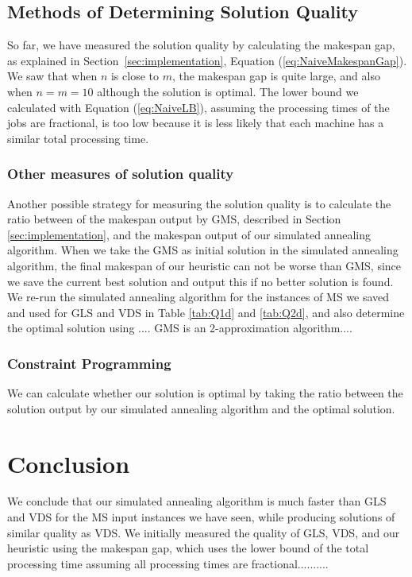 \documentclass[12pt,a4paper,reqno]{article}
\begin{document}
\newpage
\subsection{Methods of Determining Solution Quality} \label{subsec:SolQual}
So far, we have measured the solution quality by calculating the makespan gap, as explained in Section~\ref{sec:implementation}, Equation (\ref{eq:NaiveMakespanGap}). We saw that when $n$ is close to $m$, the makespan gap is quite large, and also when $n=m=10$ although the solution is optimal. The lower bound we calculated with Equation (\ref{eq:NaiveLB}), assuming the processing times of the jobs are fractional, is too low because it is less likely that each machine has a similar total processing time.  \\

\subsubsection{Other measures of solution quality}
\color{red}
Another possible strategy for measuring the solution quality is to calculate the ratio between of the makespan output by GMS, described in Section \ref{sec:implementation}, and the makespan output of our simulated annealing algorithm. When we take the GMS as initial solution in the simulated annealing algorithm, the final makespan of our heuristic can not be worse than GMS, since we save the current best solution and output this if no better solution is found. We re-run the simulated annealing algorithm for the instances of MS we saved and used for GLS and VDS in Table \ref{tab:Q1d} and \ref{tab:Q2d}, and also determine the optimal solution using ....
GMS is an 2-approximation algorithm.... 
\color{black}


\subsubsection{Constraint Programming}
We can calculate whether our solution is optimal by taking the ratio between the solution output by our simulated annealing algorithm and the optimal solution.






\section{Conclusion}
We conclude that our simulated annealing algorithm is much faster than GLS and VDS for the MS input instances we have seen, while producing solutions of similar quality as VDS. We initially measured the quality of GLS, VDS, and our heuristic using the makespan gap, which uses the lower bound of the total processing time assuming all processing times are fractional.......... 
\end{document}
